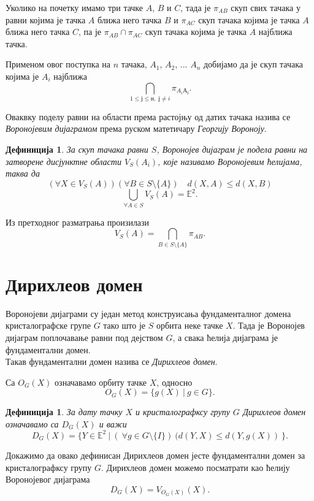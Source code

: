 \documentclass[12pt]{report}
\newtheorem{definition}[theorem]{\bf Дефиниција}
\begin{document}
Уколико на почетку имамо три тачке $A$, $B$ и $C$, тада је $\pi _{AB}$ скуп свих тачака у равни којима је тачка $A$ ближа него тачка $B$ и $\pi _{AC}$ скуп тачака којима је тачка $A$ ближа него тачка $C$, па је $\pi _{AB} \cap \pi _{AC}$ скуп тачака којима је тачка $A$ најближа тачка.

Применом овог поступка на  $n$ тачака, $A_1$, $A_2$, ... $A_n$ добијамо да је скуп тачака којима је $A_i$ најближа   $$\bigcap _{1\leq ј\leq н,\; ј\neq i} \pi_{A_i А_ј}.$$

Оваквку поделу равни на области према растојњу од датих тачака назива се \emph{Воронојевим дијаграмом} према руском матетичару \emph{Георгију Вороноју}.

\begin{definition}%
За скуп тачака равни $S$, Воронојев дијаграм је подела равни на затворене дисјунктне области $V_S(A_i)$, које називамо Воронојевим  ћелијама, таква да
$$ (\forall X \in V_{S}(A))(\forall B \in S\setminus \{A\})\quad d(X,A)\leq d(X,B) $$
$$ \bigcup_{\forall A \in S} V_{S}(A) = \mathbb{E}^2 .$$

\end{definition}

Из претходног разматрања произилази
$$V_S(A) = \bigcap _{B \in S \setminus \{A\}} \pi_{AB}.$$ 

\section{Дирихлеов домен}

Воронојеви дијаграми су један метод конструисања фундаменталног домена кристалографске групе $G$ тако што је $S$ орбита неке тачке $X$. Тада је Воронојев дијаграм поплочавање равни под дејством $G$, а свака ћелија дијаграма је фундаментални домен. \\
Такав фундаментални домен назива се \emph{Дирихлеов домен}.

Са $O_G(X)$ означавамо орбиту тачке $X$, односно
$$O_G(X) = \{g(X)\:|\:g \in G\} .$$

\begin{definition}
За дату тачку $X$ и кристалографксу групу $G$ Дирихлеов домен означавамо са $D_G(X)$ и важи
$$D_G(X) = \{Y \in \mathbb{E}^2\:|\:(\:\forall g \in G \setminus \{I\})\:(d(Y,X)\leq d(Y,g(X))\:\}.$$
\end{definition}

\noindent  Докажимо да овако дефинисан Дирихлеов домен јесте фундаментални домен за кристалографксу групу $G$.
Дирихлеов домен можемо посматрати као ћелију Воронојевог дијаграма 
$$D_G(X)= V_{O_G(X)}(X).$$
\end{document}
